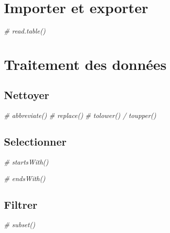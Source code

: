 \documentclass[
  french,
]{scrbook}
\newenvironment{Shaded}{\begin{snugshade}}{\end{snugshade}}
\newcommand{\CommentTok}[1]{\textcolor[rgb]{0.56,0.35,0.01}{\textit{#1}}}
\begin{document}
\hypertarget{data-importer}{%
\chapter{Importer et exporter}\label{data-importer}}

\begin{Shaded}
\begin{Highlighting}[]
\CommentTok{\# read.table()}
\end{Highlighting}
\end{Shaded}

\hypertarget{data-traitement}{%
\chapter{Traitement des données}\label{data-traitement}}

\hypertarget{data-nettoyer}{%
\section{Nettoyer}\label{data-nettoyer}}

\begin{Shaded}
\begin{Highlighting}[]
\CommentTok{\# abbreviate()}
\CommentTok{\# replace()}
\CommentTok{\# tolower() / toupper()}
\end{Highlighting}
\end{Shaded}

\hypertarget{data-selectionner}{%
\section{Selectionner}\label{data-selectionner}}

\begin{Shaded}
\begin{Highlighting}[]
\CommentTok{\# startsWith()}

\CommentTok{\# endsWith()}
\end{Highlighting}
\end{Shaded}

\hypertarget{data-filtrer}{%
\section{Filtrer}\label{data-filtrer}}

\begin{Shaded}
\begin{Highlighting}[]
\CommentTok{\# subset()}
\end{Highlighting}
\end{Shaded}
\end{document}

